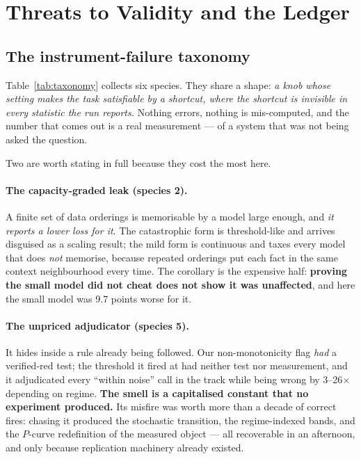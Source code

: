 \section{Threats to Validity and the Ledger}
\label{sec:threats}

\subsection{The instrument-failure taxonomy}

\begin{table}[t]\centering\small
\caption{Settings that disable the test. Each is legal, documented and deliberate, and each removes
the thing the experiment was built to detect. Every species has an instance in this study.}
\label{tab:taxonomy}

\end{table}

Table~\ref{tab:taxonomy} collects six species. They share a shape: \emph{a knob whose setting makes
the task satisfiable by a shortcut, where the shortcut is invisible in every statistic the run
reports.} Nothing errors, nothing is mis-computed, and the number that comes out is a real
measurement --- of a system that was not being asked the question.

Two are worth stating in full because they cost the most here.

\paragraph{The capacity-graded leak (species 2).} A finite set of data orderings is memorisable by a
model large enough, and \emph{it reports a lower loss for it}. The catastrophic form is
threshold-like and arrives disguised as a scaling result; the mild form is continuous and taxes
every model that does \emph{not} memorise, because repeated orderings put each fact in the same
context neighbourhood every time. The corollary is the expensive half: \textbf{proving the small
model did not cheat does not show it was unaffected}, and here the small model was 9.7 points worse
for it.

\paragraph{The unpriced adjudicator (species 5).} It hides inside a rule already being followed. Our
non-monotonicity flag \emph{had} a verified-red test; the threshold it fired at had neither test nor
measurement, and it adjudicated every ``within noise'' call in the track while being wrong by
3--26$\times$ depending on regime. \textbf{The smell is a capitalised constant that no experiment
produced.} Its misfire was worth more than a decade of correct fires: chasing it produced the
stochastic transition, the regime-indexed bands, and the $P$-curve redefinition of the measured
object --- all recoverable in an afternoon, and only because replication machinery already existed.

